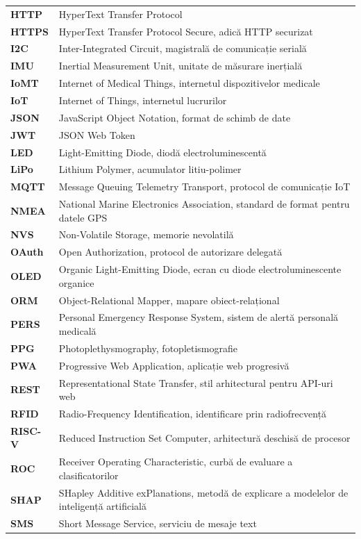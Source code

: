 ﻿\documentclass[12pt,a4paper,twoside]{article}
\begin{document}
{\begin{longtable}{@{}>{\bfseries}p{2.7cm}p{10.6cm}@{}}
HTTP & HyperText Transfer Protocol\\
HTTPS & HyperText Transfer Protocol Secure, adică HTTP securizat\\
I2C & Inter-Integrated Circuit, magistrală de comunicație serială\\
IMU & Inertial Measurement Unit, unitate de măsurare inerțială\\
IoMT & Internet of Medical Things, internetul dispozitivelor medicale\\
IoT & Internet of Things, internetul lucrurilor\\
JSON & JavaScript Object Notation, format de schimb de date\\
JWT & JSON Web Token\\
LED & Light-Emitting Diode, diodă electroluminescentă\\
LiPo & Lithium Polymer, acumulator litiu-polimer\\
MQTT & Message Queuing Telemetry Transport, protocol de comunicație IoT\\
NMEA & National Marine Electronics Association, standard de format pentru datele GPS\\
NVS & Non-Volatile Storage, memorie nevolatilă\\
OAuth & Open Authorization, protocol de autorizare delegată\\
OLED & Organic Light-Emitting Diode, ecran cu diode electroluminescente organice\\
ORM & Object-Relational Mapper, mapare obiect-relațional\\
PERS & Personal Emergency Response System, sistem de alertă personală medicală\\
PPG & Photoplethysmography, fotopletismografie\\
PWA & Progressive Web Application, aplicație web progresivă\\
REST & Representational State Transfer, stil arhitectural pentru API-uri web\\
RFID & Radio-Frequency Identification, identificare prin radiofrecvență\\
RISC-V & Reduced Instruction Set Computer, arhitectură deschisă de procesor\\
ROC & Receiver Operating Characteristic, curbă de evaluare a clasificatorilor\\
SHAP & SHapley Additive exPlanations, metodă de explicare a modelelor de inteligență artificială\\
SMS & Short Message Service, serviciu de mesaje text\\

\end{longtable}}
\end{document}
